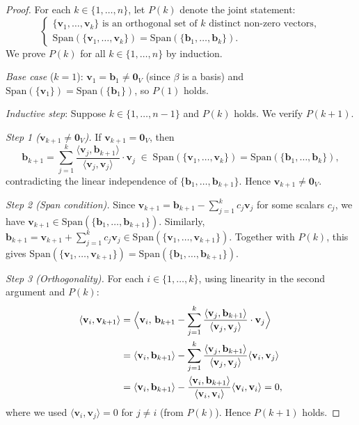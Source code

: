 \documentclass[11pt, a4paper, notitlepage]{report}
\theoremstyle{definition}
\theoremstyle{remark}
\begin{document}
\begin{proof}
For each $k\in\{1,\ldots,n\}$, let $P(k)$ denote the joint statement:
\[
  \begin{cases}
    \{\mathbf{v}_1,\ldots,\mathbf{v}_k\} \text{ is an orthogonal set of $k$ distinct non-zero vectors},\\
    \mathrm{Span}(\{\mathbf{v}_1,\ldots,\mathbf{v}_k\}) = \mathrm{Span}(\{\mathbf{b}_1,\ldots,\mathbf{b}_k\}).
  \end{cases}
\]
We prove $P(k)$ for all $k\in\{1,\ldots,n\}$ by induction.

\medskip
\textit{Base case} ($k=1$): $\mathbf{v}_1 = \mathbf{b}_1 \neq \mathbf{0}_V$ (since $\beta$ is a
basis) and $\mathrm{Span}(\{\mathbf{v}_1\}) = \mathrm{Span}(\{\mathbf{b}_1\})$, so $P(1)$ holds.

\medskip
\textit{Inductive step}: Suppose $k\in\{1,\ldots,n-1\}$ and $P(k)$ holds. We verify $P(k+1)$.

\textit{Step 1 ($\mathbf{v}_{k+1}\neq\mathbf{0}_V$).}
If $\mathbf{v}_{k+1} = \mathbf{0}_V$, then
\[
  \mathbf{b}_{k+1}
  = \sum_{j=1}^{k}\frac{\langle\mathbf{v}_j,\mathbf{b}_{k+1}\rangle}{\langle\mathbf{v}_j,\mathbf{v}_j\rangle}\cdot\mathbf{v}_j
  \;\in\; \mathrm{Span}(\{\mathbf{v}_1,\ldots,\mathbf{v}_k\})
  = \mathrm{Span}(\{\mathbf{b}_1,\ldots,\mathbf{b}_k\}),
\]
contradicting the linear independence of $\{\mathbf{b}_1,\ldots,\mathbf{b}_{k+1}\}$.
Hence $\mathbf{v}_{k+1}\neq\mathbf{0}_V$.

\textit{Step 2 (Span condition).}
Since $\mathbf{v}_{k+1} = \mathbf{b}_{k+1} - \sum_{j=1}^k c_j\mathbf{v}_j$ for some scalars $c_j$,
we have $\mathbf{v}_{k+1}\in\mathrm{Span}(\{\mathbf{b}_1,\ldots,\mathbf{b}_{k+1}\})$.
Similarly, $\mathbf{b}_{k+1} = \mathbf{v}_{k+1} + \sum_{j=1}^k c_j\mathbf{v}_j\in\mathrm{Span}(\{\mathbf{v}_1,\ldots,\mathbf{v}_{k+1}\})$.
Together with $P(k)$, this gives
$\mathrm{Span}(\{\mathbf{v}_1,\ldots,\mathbf{v}_{k+1}\}) = \mathrm{Span}(\{\mathbf{b}_1,\ldots,\mathbf{b}_{k+1}\})$.

\textit{Step 3 (Orthogonality).}
For each $i\in\{1,\ldots,k\}$, using linearity in the second argument and $P(k)$:
\begin{align*}
  \langle\mathbf{v}_i,\mathbf{v}_{k+1}\rangle
  &= \Bigl\langle\mathbf{v}_i,\,\mathbf{b}_{k+1}
     - \sum_{j=1}^k\frac{\langle\mathbf{v}_j,\mathbf{b}_{k+1}\rangle}{\langle\mathbf{v}_j,\mathbf{v}_j\rangle}\cdot\mathbf{v}_j\Bigr\rangle \\
  &= \langle\mathbf{v}_i,\mathbf{b}_{k+1}\rangle
     - \sum_{j=1}^k\frac{\langle\mathbf{v}_j,\mathbf{b}_{k+1}\rangle}{\langle\mathbf{v}_j,\mathbf{v}_j\rangle}\langle\mathbf{v}_i,\mathbf{v}_j\rangle \\
  &= \langle\mathbf{v}_i,\mathbf{b}_{k+1}\rangle
     - \frac{\langle\mathbf{v}_i,\mathbf{b}_{k+1}\rangle}{\langle\mathbf{v}_i,\mathbf{v}_i\rangle}\langle\mathbf{v}_i,\mathbf{v}_i\rangle = 0,
\end{align*}
where we used $\langle\mathbf{v}_i,\mathbf{v}_j\rangle = 0$ for $j\neq i$ (from $P(k)$).
Hence $P(k+1)$ holds.


\end{proof}
\end{document}
